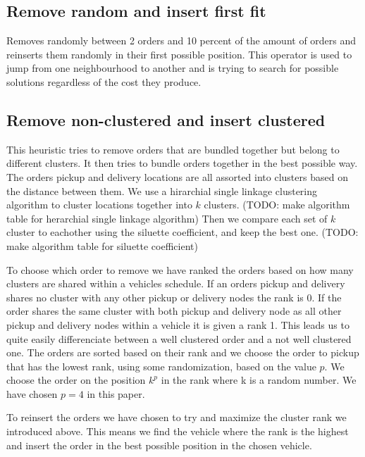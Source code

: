 \documentclass[../main.tex]{subfiles}
\begin{document}
\subsection{Remove random and insert first fit}
\label{sec:rand}
Removes randomly between 2 orders and 10 percent of the amount of orders and reinserts them randomly in their first possible position. 
This operator is used to jump from one neighbourhood to another and is trying to search for possible solutions regardless of the cost they produce.

\subsection{Remove non-clustered and insert clustered}
\label{sec:clust}
This heuristic tries to remove orders that are bundled together but belong to different clusters. It then tries to bundle orders together in the best possible way.
The orders pickup and delivery locations are all assorted into clusters based on the distance between them. 
We use a hirarchial single linkage clustering algorithm to cluster locations together into $k$ clusters. (TODO: make algorithm table for herarchial single linkage algorithm) 
Then we compare each set of $k$ cluster to eachother using the siluette coefficient, and keep the best one. (TODO: make algorithm table for siluette coefficient) \newlinw \par
To choose which order to remove we have ranked the orders based on how many clusters are shared within a vehicles schedule.
If an orders pickup and delivery shares no cluster with any other pickup or delivery nodes the rank is 0. 
If the order shares the same cluster with both pickup and delivery node as all other pickup and delivery nodes within a vehicle it is given a rank 1.  
This leads us to quite easily differenciate between a well clustered order and a not well clustered one.
The orders are sorted based on their rank and we choose the order to pickup that has the lowest rank, using some randomization, based on the value $p$. 
We choose the order on the position $k^p$ in the rank where k is a random number. 
We have chosen $p=4$ in this paper.  \newline \par
To reinsert the orders we have chosen to try and maximize the cluster rank we introduced above. This means we find the vehicle where the rank is the highest and insert the order in the best possible position in the chosen vehicle. 
\end{document}
